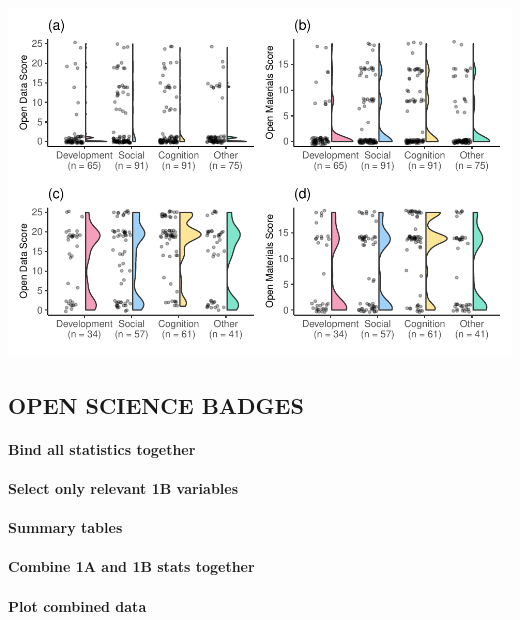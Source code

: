 \documentclass[
  english,
  man]{apa6}
\let\oldparagraph\paragraph
\renewcommand{\paragraph}[1]{\oldparagraph{#1}\mbox{}}
\begin{document}
\includegraphics{icd_special_issue_files/figure-latex/1ab-rain-1.pdf}

\hypertarget{open-science-badges}{%
\subsection{OPEN SCIENCE BADGES}\label{open-science-badges}}

\hypertarget{bind-all-statistics-together}{%
\paragraph{Bind all statistics together}\label{bind-all-statistics-together}}

\hypertarget{select-only-relevant-1b-variables}{%
\paragraph{Select only relevant 1B variables}\label{select-only-relevant-1b-variables}}

\hypertarget{summary-tables}{%
\paragraph{Summary tables}\label{summary-tables}}

\hypertarget{combine-1a-and-1b-stats-together}{%
\paragraph{Combine 1A and 1B stats together}\label{combine-1a-and-1b-stats-together}}

\hypertarget{plot-combined-data}{%
\paragraph{Plot combined data}\label{plot-combined-data}}
\end{document}
